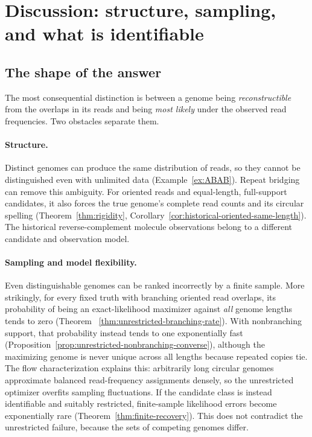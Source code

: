 \section{Discussion: structure, sampling, and what is identifiable}
\label{sec:discussion}

\subsection{The shape of the answer}

The most consequential distinction is between a genome
being \emph{reconstructible} from the overlaps in its reads
and being \emph{most likely} under the observed read
frequencies. Two obstacles separate them.

\paragraph{Structure.}
Distinct genomes can produce the same distribution of
reads, so they cannot be distinguished even with unlimited
data (Example~\ref{ex:ABAB}). Repeat bridging can remove
this ambiguity. For oriented reads and equal-length,
full-support candidates, it also forces the true genome's
complete read counts and its circular spelling
(Theorem~\ref{thm:rigidity},
Corollary~\ref{cor:historical-oriented-same-length}).
The historical reverse-complement molecule observations
belong to a different candidate and observation model.

\paragraph{Sampling and model flexibility.}
Even distinguishable genomes can be ranked incorrectly
by a finite sample. More strikingly, for every fixed truth
with branching oriented read overlaps, its probability
of being an exact-likelihood maximizer against \emph{all} genome
lengths tends to zero (Theorem~
\ref{thm:unrestricted-branching-rate}). With nonbranching
support, that probability instead tends to one exponentially
fast (Proposition~\ref{prop:unrestricted-nonbranching-converse}),
although the maximizing genome is never unique across all
lengths because repeated copies tie.
The flow characterization explains this: arbitrarily long
circular genomes approximate balanced read-frequency
assignments densely, so the unrestricted optimizer
overfits sampling fluctuations. If the candidate class
is instead identifiable and suitably restricted,
finite-sample likelihood errors become exponentially
rare (Theorem~\ref{thm:finite-recovery}).
This does not contradict the unrestricted failure,
because the sets of competing genomes differ.

